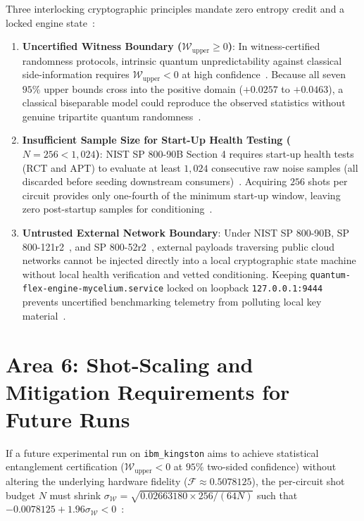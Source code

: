 \documentclass[10pt,letterpaper]{article}
\begin{document}
Three interlocking cryptographic principles mandate zero entropy credit and a locked engine state~\cite{qfx_doc}:
\begin{enumerate}\setlength{\itemsep}{2pt}\setlength{\parskip}{0pt}
    \item \textbf{Uncertified Witness Boundary ($\mathcal{W}_{\text{upper}} \ge 0$)}: In witness-certified randomness protocols, intrinsic quantum unpredictability against classical side-information requires $\mathcal{W}_{\text{upper}} < 0$ at high confidence~\cite{qfx_doc}. Because all seven $95\%$ upper bounds cross into the positive domain ($+0.0257$ to $+0.0463$), a classical biseparable model could reproduce the observed statistics without genuine tripartite quantum randomness~\cite{qfx_doc}.
    \item \textbf{Insufficient Sample Size for Start-Up Health Testing ($N = 256 < 1{,}024$)}: NIST SP 800-90B Section 4 requires start-up health tests (RCT and APT) to evaluate at least $1{,}024$ consecutive raw noise samples (all discarded before seeding downstream consumers)~\cite{qfx_doc,nist_e259}. Acquiring $256$ shots per circuit provides only one-fourth of the minimum start-up window, leaving zero post-startup samples for conditioning~\cite{qfx_doc}.
    \item \textbf{Untrusted External Network Boundary}: Under NIST SP 800-90B, SP 800-121r2~\cite{nist_sp800_121}, and SP 800-52r2~\cite{nist_sp800_52}, external payloads traversing public cloud networks cannot be injected directly into a local cryptographic state machine without local health verification and vetted conditioning. Keeping \texttt{quantum-flex-engine-mycelium.service} locked on loopback \texttt{127.0.0.1:9444} prevents uncertified benchmarking telemetry from polluting local key material~\cite{qfx_doc}.
\end{enumerate}

\section{Area 6: Shot-Scaling and Mitigation Requirements for Future Runs}

If a future experimental run on \texttt{ibm\_kingston} aims to achieve statistical entanglement certification ($\mathcal{W}_{\text{upper}} < 0$ at $95\%$ two-sided confidence) without altering the underlying hardware fidelity ($\mathcal{F} \approx 0.5078125$), the per-circuit shot budget $N$ must shrink $\sigma_{\mathcal{W}} = \sqrt{0.02663180 \times 256 / (64 N)}$ such that $-0.0078125 + 1.96 \sigma_{\mathcal{W}} < 0$~\cite{qfx_doc}:
\end{document}
